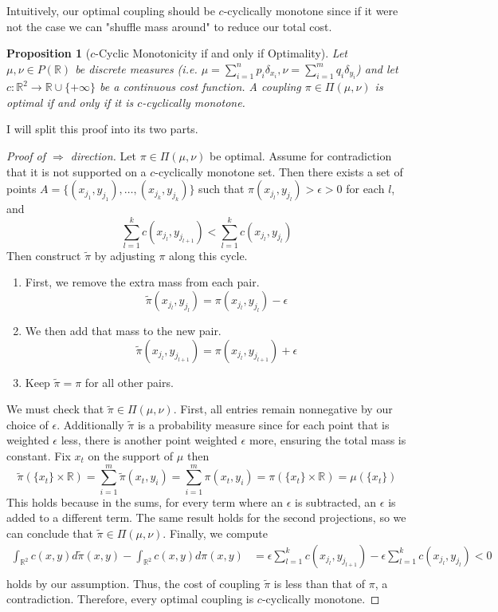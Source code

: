 \documentclass[11pt]{amsart}
\newtheorem{proposition}[theorem]{Proposition}
\theoremstyle{definition}                  %
\theoremstyle{remark}                      %
\begin{document}
Intuitively, our optimal coupling should be $c$-cyclically monotone since if it were not the case we can "shuffle mass around" to reduce our total cost.

\begin{proposition}[$c$-Cyclic Monotonicity if and only if Optimality]\label{cciffo}
    Let $\mu, \nu \in P( \mathbb{R})$ be discrete measures (i.e.  $\mu = \sum_{i=1}^{n}p_i \delta_{x_i}, \nu = \sum_{i=1}^{m}q_i \delta_{y_i}$)
    and let $c : \mathbb{R}^2 \rightarrow \mathbb{R} \cup \{+\infty\}$ be a continuous cost function. 
    A coupling $\pi \in \Pi(\mu,\nu)$ is optimal if and only if it is $c$-cyclically monotone.
\end{proposition}
I will split this proof into its two parts.
\begin{proof}[Proof of $\Rightarrow$ direction]
    Let $\pi \in \Pi(\mu,\nu)$ be optimal. Assume for contradiction that it is not supported
    on a $c$-cyclically monotone set. Then there exists a set of points $A = \{(x_{j_1},y_{j_1}),\dots,(x_{j_k},y_{j_k})\}$ such that
    $\pi(x_{j_l},y_{j_l}) > \epsilon > 0$ for each $l$, and
    \[
        \sum_{l=1}^{k}c(x_{j_l},y_{j_{l+1}}) < \sum_{l=1}^{k}c(x_{j_l},y_{j_l})
    \] 
    Then construct $\tilde \pi$ by adjusting $\pi $ along this cycle. 
    \begin{enumerate}
        \item First, we remove the extra mass from each pair.
            \[
                \tilde \pi(x_{j_l},y_{j_l}) = \pi(x_{j_l},y_{j_l}) - \epsilon
            \] 
        \item We then add that mass to the new pair.
            \[
                \tilde \pi(x_{j_l}, y_{j_{l+1}}) = \pi(x_{j_l}, y_{j_{l+1}}) + \epsilon
            \] 
        \item Keep $\tilde \pi = \pi$ for all other pairs.
    \end{enumerate}
    We must check that $\tilde \pi \in \Pi(\mu,\nu)$. First, all entries remain nonnegative by our choice of $\epsilon$.
    Additionally $\tilde \pi$ is a probability measure since for each point that is weighted $\epsilon$ less, there is another point weighted $\epsilon$ more,
    ensuring the total mass is constant.
    Fix $x_t$ on the support of  $\mu$ then 
    \[
        \tilde \pi (\{x_t\} \times \mathbb{R}) = \sum_{i=1}^{m} \tilde \pi(x_t,y_i) = \sum_{i=1}^{m} \pi(x_t,y_i) = \pi(\{x_t\} \times \mathbb{R}) = \mu(\{x_t\})
    \] 
    This holds because in the sums, for every term where an $\epsilon$ is subtracted, an $\epsilon$ is added to a different term. 
    The same result holds for the second projections, so we can conclude that $\tilde \pi \in \Pi(\mu,\nu)$. Finally,
    we compute
    \begin{align*}
        \int_{ \mathbb{R}^2}^{}c(x,y)d\tilde \pi(x,y) - \int_{ \mathbb{R}^2}^{}c(x,y) d \pi(x,y) &=
        \epsilon \sum_{l=1}^{k}c(x_{j_l},y_{j_{l+1}}) - \epsilon \sum_{l=1}^{k}c(x_{j_l},y_{j_l}) < 0\\ 
    \end{align*}
    holds by our assumption. Thus, the cost of coupling $\tilde \pi$ is less than that of $\pi$, a contradiction.
    Therefore, every optimal coupling is $c$-cyclically monotone.
\end{proof}
\end{document}
